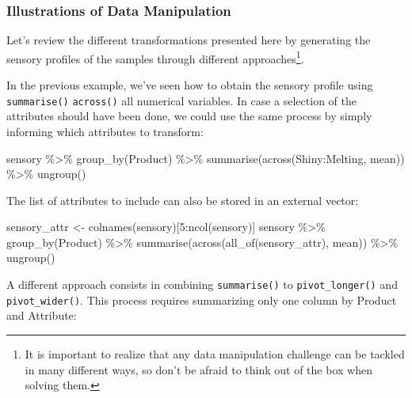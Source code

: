 \documentclass[
]{krantz}
\makeatletter
\newenvironment{Shaded}{\begin{snugshade}}{\end{snugshade}}
\newcommand{\DecValTok}[1]{\textcolor[rgb]{0.06,0.06,0.06}{#1}}
\newcommand{\FunctionTok}[1]{\textcolor[rgb]{0,0,0}{#1}}
\newcommand{\NormalTok}[1]{#1}
\newcommand{\OtherTok}[1]{\textcolor[rgb]{0.37,0.37,0.37}{#1}}
\newcommand{\SpecialCharTok}[1]{\textcolor[rgb]{0,0,0}{#1}}
\newenvironment{kframe}{%
\medskip{}
\setlength{\fboxsep}{.8em}
 \def\at@end@of@kframe{}%
 \ifinner\ifhmode%
  \def\at@end@of@kframe{\end{minipage}}%
  \begin{minipage}{\columnwidth}%
 \fi\fi%
 \def\FrameCommand##1{\hskip\@totalleftmargin \hskip-\fboxsep
 \colorbox{shadecolor}{##1}\hskip-\fboxsep
     \hskip-\linewidth \hskip-\@totalleftmargin \hskip\columnwidth}%
 \MakeFramed {\advance\hsize-\width
   \@totalleftmargin\z@ \linewidth\hsize
   \@setminipage}}%
 {\par\unskip\endMakeFramed%
 \at@end@of@kframe}
\renewenvironment{Shaded}{\begin{kframe}}{\end{kframe}}
\makeatother
\begin{document}
\hypertarget{means}{%
\subsubsection{Illustrations of Data Manipulation}\label{means}}

Let's review the different transformations presented here by generating the sensory profiles of the samples through different approaches\footnote{It is important to realize that any data manipulation challenge can be tackled in many different ways, so don't be afraid to think out of the box when solving them.}.

In the previous example, we've seen how to obtain the sensory profile using \texttt{summarise()} \texttt{across()} all numerical variables. In case a selection of the attributes should have been done, we could use the same process by simply informing which attributes to transform:

\begin{Shaded}
\begin{Highlighting}[]
\NormalTok{sensory }\SpecialCharTok{\%\textgreater{}\%}
  \FunctionTok{group\_by}\NormalTok{(Product) }\SpecialCharTok{\%\textgreater{}\%}
  \FunctionTok{summarise}\NormalTok{(}\FunctionTok{across}\NormalTok{(Shiny}\SpecialCharTok{:}\NormalTok{Melting, mean)) }\SpecialCharTok{\%\textgreater{}\%}
  \FunctionTok{ungroup}\NormalTok{()}
\end{Highlighting}
\end{Shaded}

The list of attributes to include can also be stored in an external vector:

\begin{Shaded}
\begin{Highlighting}[]
\NormalTok{sensory\_attr }\OtherTok{\textless{}{-}} \FunctionTok{colnames}\NormalTok{(sensory)[}\DecValTok{5}\SpecialCharTok{:}\FunctionTok{ncol}\NormalTok{(sensory)]}
\NormalTok{sensory }\SpecialCharTok{\%\textgreater{}\%}
  \FunctionTok{group\_by}\NormalTok{(Product) }\SpecialCharTok{\%\textgreater{}\%}
  \FunctionTok{summarise}\NormalTok{(}\FunctionTok{across}\NormalTok{(}\FunctionTok{all\_of}\NormalTok{(sensory\_attr), mean)) }\SpecialCharTok{\%\textgreater{}\%}
  \FunctionTok{ungroup}\NormalTok{()}
\end{Highlighting}
\end{Shaded}

A different approach consists in combining \texttt{summarise()} to \texttt{pivot\_longer()} and \texttt{pivot\_wider()}. This process requires summarizing only one column by Product and Attribute:
\end{document}
